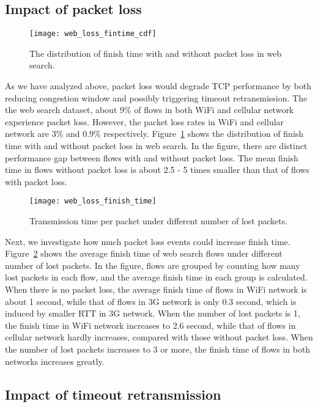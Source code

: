 \subsection{Impact of packet loss}
\label{sec:web_pkt_loss}

\begin{figure}[th]
\centering
\texttt{[image: web\_loss\_fintime\_cdf]}
\caption{The distribution of finish time with and without packet loss in web search.}
\label{fig:web_loss_fintime_cdf}
\end{figure}

As we have analyzed above, packet loss would degrade TCP performance by both reducing congestion window and possibly triggering timeout retransmission. The the web search dataset, about 9\% of flows in both WiFi and cellular network experience packet loss. However, the packet loss rates in WiFi and cellular network are 3\% and 0.9\% respectively. Figure~\ref{fig:web_loss_fintime_cdf} shows the distribution of finish time with and without packet loss in web search. In the figure, there are distinct performance gap between flows with and without packet loss. The mean finish time in flows without packet loss is about 2.5 - 5 times smaller than that of flows with packet loss.

\begin{figure}[th]
\centering
\texttt{[image: web\_loss\_finish\_time]}
\caption{Transmission time per packet under different number of lost packets.}
\label{fig:web_loss_finish_time}
\end{figure}

Next, we investigate how much packet loss events could increase finish time. Figure~\ref{fig:web_loss_finish_time} shows the average finish time of web search flows under different number of lost packets. In the figure, flows are grouped by counting how many lost packets in each flow, and the average finish time in each group is calculated. When there is no packet loss, the average finish time of flows in WiFi network is about 1 second, while that of flows in 3G network is only 0.3 second, which is induced by smaller RTT in 3G network. When the number of lost packets is 1, the finish time in WiFi network increases to 2.6 second, while that of flows in cellular network hardly increases, compared with those without packet loss. When the number of lost packets increases to 3 or more, the finish time of flows in both networks increases greatly.

\subsection{Impact of timeout retransmission}


